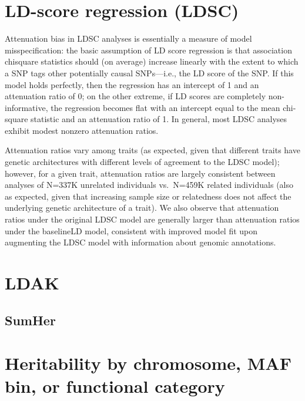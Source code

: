 \documentclass[
]{book}
\begin{document}
\hypertarget{ld-score-regression-ldsc}{%
\section{LD-score regression (LDSC)}\label{ld-score-regression-ldsc}}

Attenuation bias in LDSC analyses is essentially a measure of model misspecification: the basic assumption of LD score regression is that association chisquare statistics should (on average) increase linearly with the extent to which a SNP tags other potentially causal SNPs---i.e., the LD score of the SNP. If this model holds perfectly, then the regression has an intercept of 1 and an attenuation ratio of 0; on the other extreme, if LD scores are completely non-informative, the regression becomes flat with an intercept equal to the mean chi-square statistic and an attenuation ratio of 1. In general, most LDSC analyses exhibit modest nonzero attenuation ratios.

Attenuation ratios vary among traits (as expected, given that different traits have genetic architectures with different levels of agreement to the LDSC model); however, for a given trait, attenuation ratios are largely consistent between analyses of N=337K unrelated individuals vs.~N=459K related individuals (also as expected, given that increasing sample size or relatedness does not affect the underlying genetic architecture of a trait). We also observe that attenuation ratios under the original LDSC model are generally larger than attenuation ratios under the baselineLD model, consistent with improved model fit upon augmenting the LDSC model with information about genomic annotations.

\hypertarget{ldak}{%
\section{LDAK}\label{ldak}}

\hypertarget{sumher}{%
\subsection{SumHer}\label{sumher}}

\hypertarget{heritability-by-chromosome-maf-bin-or-functional-category}{%
\section{Heritability by chromosome, MAF bin, or functional category}\label{heritability-by-chromosome-maf-bin-or-functional-category}}
\end{document}
